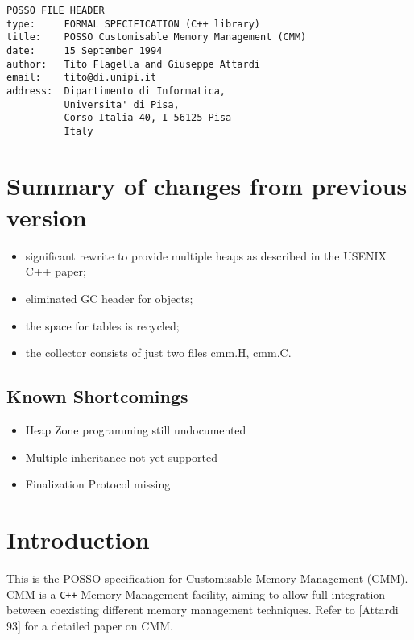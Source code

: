 \def\theenumi{\alph{enumi}}
\def\labelenumi{(\alph{enumi})}
\pagestyle{myheadings}

\begin{verbatim}
POSSO FILE HEADER
type:     FORMAL SPECIFICATION (C++ library)
title:    POSSO Customisable Memory Management (CMM)
date:     15 September 1994
author:   Tito Flagella and Giuseppe Attardi
email:    tito@di.unipi.it
address:  Dipartimento di Informatica,
          Universita' di Pisa,
          Corso Italia 40, I-56125 Pisa
          Italy
\end{verbatim}

\section{Summary of changes from previous version}
\begin{itemize}
\item significant rewrite to provide multiple heaps as described in the
USENIX C++ paper;
\item eliminated GC header for objects;
\item the space for tables is recycled;
\item the collector consists of just two files cmm.H, cmm.C.
\end{itemize}

\subsection {Known Shortcomings}
\begin{itemize}
\item Heap Zone programming still undocumented
\item Multiple inheritance not yet supported
\item Finalization Protocol missing
\end{itemize}

\section {Introduction}

This is the POSSO specification for Customisable Memory Management (CMM).
CMM is a \verb|C++| Memory Management facility, aiming to
allow full integration between coexisting different memory
management techniques.  Refer to [Attardi 93] for a detailed paper on CMM.

